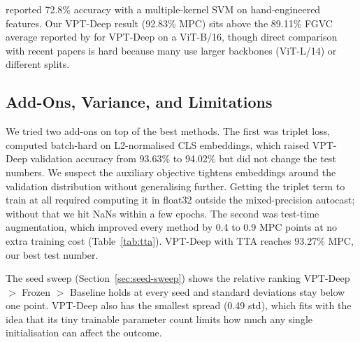 \citet{nilsback2008} reported 72.8\% accuracy with a multiple-kernel SVM on hand-engineered features. Our VPT-Deep result (92.83\% MPC) sits above the 89.11\% FGVC average reported by \citet{jia2022vpt} for VPT-Deep on a ViT-B/16, though direct comparison with recent papers is hard because many use larger backbones (ViT-L/14) or different splits.

\subsection{Add-Ons, Variance, and Limitations}

We tried two add-ons on top of the best methods. The first was triplet loss, computed batch-hard on L2-normalised CLS embeddings, which raised VPT-Deep validation accuracy from 93.63\% to 94.02\% but did not change the test numbers. We suspect the auxiliary objective tightens embeddings around the validation distribution without generalising further. Getting the triplet term to train at all required computing it in float32 outside the mixed-precision autocast; without that we hit NaNs within a few epochs. The second was test-time augmentation, which improved every method by 0.4 to 0.9 MPC points at no extra training cost (Table~\ref{tab:tta}). VPT-Deep with TTA reaches 93.27\% MPC, our best test number.

The seed sweep (Section~\ref{sec:seed-sweep}) shows the relative ranking VPT-Deep $>$ Frozen $>$ Baseline holds at every seed and standard deviations stay below one point. VPT-Deep also has the smallest spread (0.49 std), which fits with the idea that its tiny trainable parameter count limits how much any single initialisation can affect the outcome.
